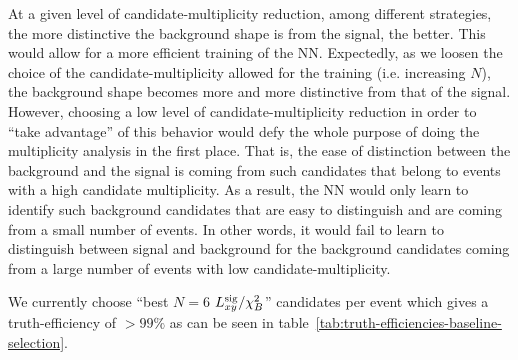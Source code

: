 At a given level of candidate-multiplicity reduction, among different strategies, the more distinctive the background shape is from the signal, the better. This would allow for a more efficient training of the NN. 
Expectedly, as we loosen the choice of the candidate-multiplicity allowed for the training (i.e. increasing $N$), the background shape becomes more and more distinctive from that of the signal.
However, choosing a low level of candidate-multiplicity reduction in order to ``take advantage'' of this behavior would defy the whole purpose of doing the multiplicity analysis in the first place.
That is, the ease of distinction between the background and the signal is coming from such candidates that belong to events with a high candidate multiplicity.
As a result, the NN would only learn to identify such background candidates that are easy to distinguish and are coming from a small number of events.
In other words, it would fail to learn to distinguish between signal and background for the background candidates coming from a large number of events with low candidate-multiplicity.

We currently choose ``best $N=6$ $L_{xy}^{\rm sig}/\chi^2_{B}$'' candidates per event which gives a truth-efficiency of $>99\%$ as can be seen in table~\ref{tab:truth-efficiencies-baseline-selection}.
